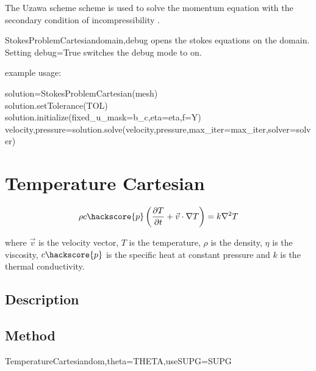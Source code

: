The Uzawa scheme scheme is used to solve the momentum equation with the secondary condition of incompressibility \cite{GROSS2006,AAMIRBERKYAN2008}.

\begin{classdesc}{StokesProblemCartesian}{domain,debug}
opens the stokes equations on the \Domain domain. Setting debug=True switches the debug mode to on.
\end{classdesc}

example usage:

solution=StokesProblemCartesian(mesh) \\
solution.setTolerance(TOL) \\
solution.initialize(fixed\_u\_mask=b\_c,eta=eta,f=Y) \\
velocity,pressure=solution.solve(velocity,pressure,max\_iter=max\_iter,solver=solver) \\

% 


\section{Temperature Cartesian}

\begin{equation}
\rho c\hackscore{p} \left (\frac{\partial T}{\partial t} + \vec{v} \cdot \nabla T \right ) = k \nabla^{2}T
\label{HEAT EQUATION}
\end{equation}

where $\vec{v}$ is the velocity vector, $T$ is the temperature, $\rho$ is the density, $\eta$ is the viscosity, $c\hackscore{p}$ is the specific heat at constant pressure and $k$ is the thermal conductivity.

\subsection{Description}

\subsection{Method}

\begin{classdesc}{TemperatureCartesian}{dom,theta=THETA,useSUPG=SUPG}
\end{classdesc}


